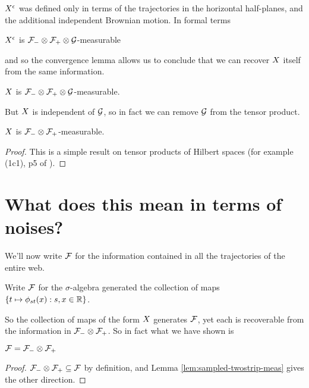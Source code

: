 {$X^{\epsilon}$ was defined only in terms of the trajectories in the
horizontal half-planes, and the additional independent Brownian
motion.  In formal terms

\begin{obs}
  $X^{\epsilon}$ is $\mathcal{F}_{-} \otimes \mathcal{F}_{+} \otimes \mathcal{G}$-measurable
\end{obs}

and so the convergence lemma allows us to conclude that we can
recover $X$ itself from the same information.

\begin{cor}
  \label{cor:sampled-twostripsreservoir-meas}
  $X$ is $\mathcal{F}_{-} \otimes \mathcal{F}_{+} \otimes \mathcal{G}$-measurable.
\end{cor}
  
But $X$ is independent of $\mathcal{G}$, so in fact we can
remove $\mathcal{G}$ from the tensor product.

\begin{lemma}
  \label{lem:sampled-twostrip-meas}
  $X$ is $\mathcal{F}_{-} \otimes \mathcal{F}_{+}$-measurable.
\end{lemma}

\begin{proof}
  This is a simple result on tensor products of
  Hilbert spaces (for example (1c1), p5 of
  \cite{tsirelson-completion}).
\end{proof}

\section{What does this mean in terms of noises?}

We'll now write $\mathcal{F}$ for the information contained in all the
trajectories of the entire web.

\begin{definition}
  Write $\mathcal{F}$ for the $\sigma$-algebra generated the
  collection of maps $\{ t \mapsto \phi_{{s}{t}}(x) : s,x \in \mathbb{R} \}$.
\end{definition}

So the collection of maps of the form $X$ generates
$\mathcal{F}$, yet each is recoverable from the information in
$\mathcal{F}_{-} \otimes \mathcal{F}_{+}$.  So in fact what we have shown is

\begin{theorem}
  $\mathcal{F} = \mathcal{F}_{-} \otimes \mathcal{F}_{+}$
\end{theorem}

\begin{proof}
  $\mathcal{F}_{-} \otimes \mathcal{F}_{+} \subseteq \mathcal{F}$ by definition, and Lemma
  \ref{lem:sampled-twostrip-meas} gives the other direction.
\end{proof}
}
